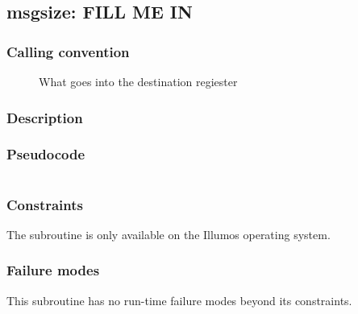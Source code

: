 \clearpage
{}
{}
\label{subr:msgsize}
\subsection*{msgsize: FILL ME IN}

\subsubsection*{Calling convention}

\begin{description}
\item[] What goes into the destination regiester
\end{description}

\subsubsection*{Description}

\subsubsection*{Pseudocode}

\begin{verbatim}
\end{verbatim}

\subsubsection*{Constraints}

The  subroutine is only available on the Illumos
operating system.

\subsubsection*{Failure modes}

This subroutine has no run-time failure modes beyond its constraints.
